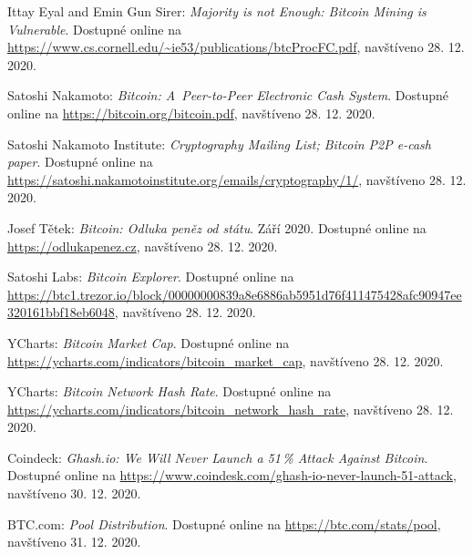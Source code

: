 \documentclass[12pt,a4paper]{article}
\begin{document}

\newpage

\begin{thebibliography}{1}

     Ittay Eyal and Emin Gun Sirer: \textit{Majority is not Enough: Bitcoin Mining is Vulnerable}. Dostupné online na \url{https://www.cs.cornell.edu/~ie53/publications/btcProcFC.pdf}, navštíveno 28. 12. 2020.

     Satoshi Nakamoto: \textit{Bitcoin: A~Peer-to-Peer Electronic Cash System}. Dostupné online na \url{https://bitcoin.org/bitcoin.pdf}, navštíveno 28. 12. 2020.

     Satoshi Nakamoto Institute: \textit{Cryptography Mailing List; Bitcoin P2P e-cash paper}. Dostupné online na \url{https://satoshi.nakamotoinstitute.org/emails/cryptography/1/}, navštíveno 28. 12. 2020.

     Josef Tětek: \textit{Bitcoin: Odluka peněz od státu}. Září 2020. Dostupné online na \url{https://odlukapenez.cz}, navštíveno 28. 12. 2020.

     Satoshi Labs: \textit{Bitcoin Explorer}. Dostupné online na \url{https://btc1.trezor.io/block/00000000839a8e6886ab5951d76f411475428afc90947ee320161bbf18eb6048}, navštíveno 28. 12. 2020.

     YCharts: \textit{Bitcoin Market Cap}. Dostupné online na \url{https://ycharts.com/indicators/bitcoin_market_cap}, navštíveno 28. 12. 2020.

     YCharts: \textit{Bitcoin Network Hash Rate}. Dostupné online na \url{https://ycharts.com/indicators/bitcoin_network_hash_rate}, navštíveno 28. 12. 2020.

     Coindeck: \textit{Ghash.io: We Will Never Launch a 51\,\% Attack Against Bitcoin}. Dostupné online na \url{https://www.coindesk.com/ghash-io-never-launch-51-attack}, navštíveno 30. 12. 2020.

     BTC.com: \textit{Pool Distribution}. Dostupné online na \url{https://btc.com/stats/pool}, navštíveno 31. 12. 2020.

\end{thebibliography}

\end{document}
